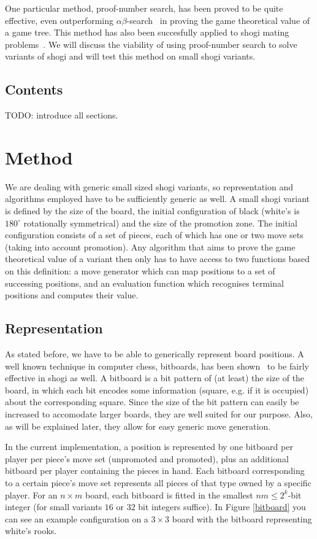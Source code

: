 \documentclass{article}
\begin{document}
One particular method, proof-number search, has been proved to be quite effective, even outperforming $\alpha\beta$-search~\cite{van2008proof} in
proving the game theoretical value of a game tree. This method has also been succesfully applied to shogi mating
problems~\cite{seo2001pn, ueda2008weak, sakuta2001performance}. We will discuss the viability of using proof-number search to solve variants of shogi and will test
this method on small shogi variants.

\subsection{Contents}
TODO: introduce all sections.

\section{Method}
We are dealing with generic small sized shogi variants, so representation and algorithms employed have to be sufficiently generic as well.
A small shogi variant is defined by the size of the board, the initial configuration of black (white's is $180^{\circ}$ rotationally symmetrical) and
the size of the promotion zone. The initial configuration consists of a set of pieces, each of which has one or two move sets (taking into account
promotion). Any algorithm that aims to prove the game theoretical value of a variant then only has to have access to two functions based on this
definition: a move generator which can map positions to a set of successing positions, and an evaluation function which recognises terminal
positions and computes their value.

\subsection{Representation}
As stated before, we have to be able to generically represent board positions. A well known technique in computer chess, bitboards, has been
shown~\cite{grimbergen2007using} to be fairly effective in shogi as well. A bitboard is a bit pattern of (at least) the size of the board,
in which each bit encodes some information (square, e.g. if it is occupied) about the corresponding square. Since the size of the bit pattern can
easily be increased to accomodate larger boards, they are well suited for our purpose. Also, as will be explained later, they allow for easy
generic move generation.

In the current implementation, a position is represented by one bitboard per player per piece's move set (unpromoted and promoted), plus an additional
bitboard per player containing the pieces in hand. Each bitboard corresponding to a certain piece's move set represents all pieces of that type
owned by a specific player. For an $n \times m$ board, each bitboard is fitted in the smallest $nm \leq 2^k$-bit integer (for small
variants $16$ or $32$ bit integers suffice). In Figure \ref{bitboard} you can see an example configuration on a $3 \times 3$ board with the
bitboard representing white's rooks.
\end{document}
